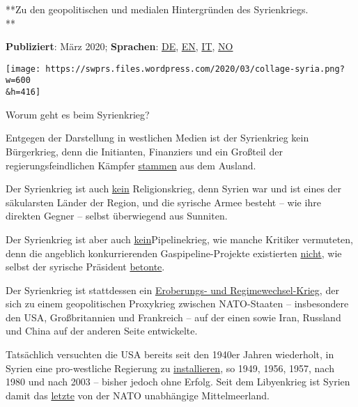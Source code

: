 **Zu den geopolitischen und medialen Hintergründen des Syrienkriegs.\\
**

\textbf{Publiziert}: März 2020; \textbf{Sprachen}:
\href{https://swprs.org/syrienkrieg-geopolitik-medien/}{DE},
\href{https://swprs.org/the-syria-deception/}{EN},
\href{https://www.pressenza.com/it/2020/03/guerra-in-siria-geopolitica-e-media/}{IT},
\href{https://steigan.no/2020/03/syriakrigen-geopolitikk-og-media/}{NO}

\texttt{[image: https://swprs.files.wordpress.com/2020/03/collage-syria.png?w=600\\\&h=416]}

Worum geht es beim Syrienkrieg?

Entgegen der Darstellung in westlichen Medien ist der Syrienkrieg kein
Bürgerkrieg, denn die Initianten, Finanziers und ein Großteil der
regierungsfeindlichen Kämpfer
\href{https://www.globalresearch.ca/syria-its-not-a-civil-war-and-it-never-was/5498602}{stammen}
aus dem Ausland.

Der Syrienkrieg ist auch
\href{https://www.theatlantic.com/international/archive/2013/03/stop-trying-to-make-syrias-war-into-a-sectarian-conflict/274060/}{kein}
Religionskrieg, denn Syrien war und ist eines der säkularsten Länder der
Region, und die syrische Armee besteht -- wie ihre direkten Gegner --
selbst überwiegend aus Sunniten.

Der Syrienkrieg ist aber auch
\href{https://www.middleeasteye.net/big-story/pipelineistan-conspiracy-war-syria-has-never-been-about-gas}{kein}Pipelinekrieg,
wie manche Kritiker vermuteten, denn die angeblich konkurrierenden
Gaspipeline-Projekte existierten
\href{https://truthout.org/articles/the-war-against-the-assad-regime-is-not-a-pipeline-war/}{nicht},
wie selbst der syrische Präsident
\href{https://www.youtube.com/watch?v=flaqLAp0Yp4\&t=1674}{betonte}.

Der Syrienkrieg ist stattdessen ein
\href{https://swprs.org/logik-imperialer-kriege/}{Eroberungs- und
Regimewechsel-Krieg}, der sich zu einem geopolitischen Proxykrieg
zwischen NATO-Staaten -- insbesondere den USA, Großbritannien und
Frankreich -- auf der einen sowie Iran, Russland und China auf der
anderen Seite entwickelte.

Tatsächlich versuchten die USA bereits seit den 1940er Jahren
wiederholt, in Syrien eine pro-westliche Regierung zu
\href{https://en.wikipedia.org/wiki/CIA_activities_in_Syria}{installieren},
so 1949, 1956, 1957, nach 1980 und nach 2003 -- bisher jedoch ohne
Erfolg. Seit dem Libyenkrieg ist Syrien damit das
\href{https://www.nato.int/cps/ua/natohq/topics_81136.htm}{letzte} von
der NATO unabhängige Mittelmeerland.

